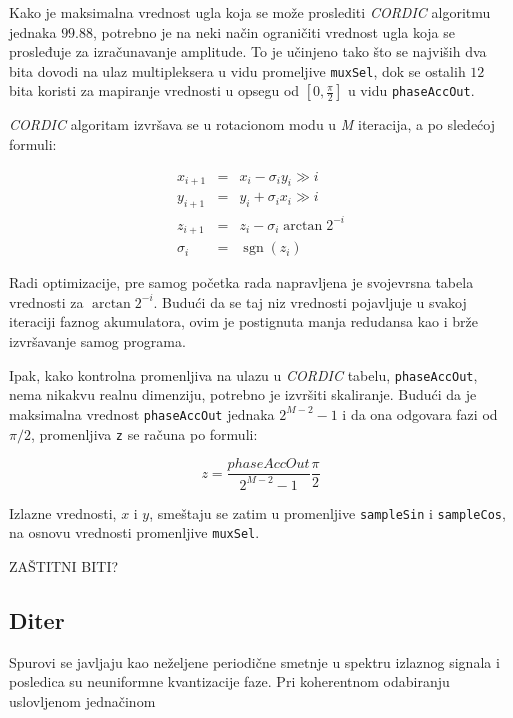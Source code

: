 \documentclass[conference]{IEEEtran}
\DeclareMathOperator{\sgn}{sgn}
\begin{document}
Kako je maksimalna vrednost ugla koja se može proslediti \textit{CORDIC} algoritmu jednaka $99.88$\textdegree, potrebno je na neki način ograničiti vrednost ugla koja se prosleđuje za izračunavanje amplitude. To je učinjeno tako što se najviših dva bita dovodi na ulaz multipleksera u vidu promeljive \texttt{muxSel}, dok se ostalih $12$ bita koristi za mapiranje vrednosti u opsegu od $[0, \frac{\pi}{2}]$ u vidu \texttt{phaseAccOut}.

\textit{CORDIC} algoritam izvršava se u rotacionom modu u \textit{M} iteracija, a po sledećoj formuli:

\begin{eqnarray}\label{kordik}
x_{i+1} &=& x_i - \sigma_i y_i \gg i 		\\
y_{i+1} &=& y_i + \sigma_i x_i \gg i 		\\
z_{i+1} &=& z_i - \sigma_i\arctan{2^{-i}}		\\
\sigma_i &=& \sgn(z_i)
\end{eqnarray}

Radi optimizacije, pre samog početka rada napravljena je svojevrsna tabela vrednosti za $\arctan{2^{-i}}$. Budući da se taj niz vrednosti pojavljuje u svakoj iteraciji faznog akumulatora, ovim je postignuta manja redudansa kao i brže izvršavanje samog programa.

Ipak, kako kontrolna promenljiva na ulazu u \textit{CORDIC} tabelu, \texttt{phaseAccOut}, nema nikakvu realnu dimenziju, potrebno je izvršiti skaliranje. Budući da je maksimalna vrednost \texttt{phaseAccOut} jednaka $2^{M-2}-1$ i da ona odgovara fazi od $\pi/2$, promenljiva \texttt{z} se računa po formuli:

\begin{equation}
z = \frac{phaseAccOut}{2^{M-2}-1} \frac{\pi}{2}
\end{equation}

Izlazne vrednosti, $x$ i $y$, smeštaju se zatim u promenljive \texttt{sampleSin} i \texttt{sampleCos}, na osnovu vrednosti promenljive \texttt{muxSel}.

ZAŠTITNI BITI?

\subsection{Diter}
Spurovi se javljaju kao neželjene periodične smetnje u spektru izlaznog signala i posledica su neuniformne kvantizacije faze. Pri koherentnom odabiranju uslovljenom jednačinom
\end{document}
